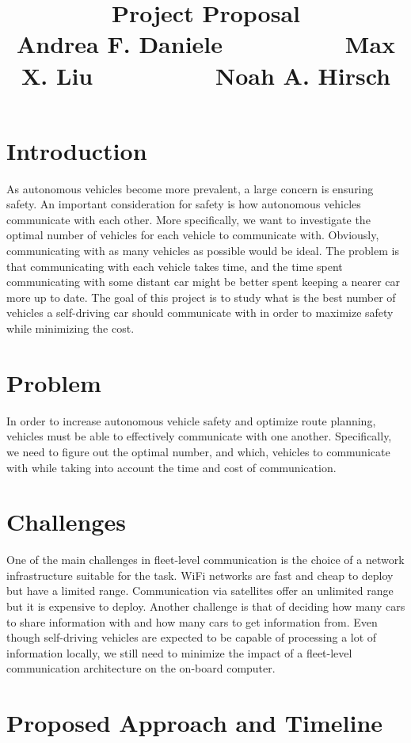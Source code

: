 \documentclass{article}
\title{Project Proposal\vspace{-6pt}\\{\large Andrea F. Daniele $\hspace{2cm}$ Max X. Liu $\hspace{2cm}$ Noah A. Hirsch }}
\begin{document}
\maketitle


\vspace{-1.2cm}

\section*{Introduction}
\vspace{-.3cm}
As autonomous vehicles become more prevalent, a large concern is ensuring safety. 
An important consideration for safety is how autonomous vehicles communicate with each other. 
More specifically, we want to investigate the optimal number of vehicles for each vehicle to communicate with. 
Obviously, communicating with as many vehicles as possible would be ideal. 
The problem is that communicating with each vehicle takes time, and the time spent communicating 
with some distant car might be better spent keeping a nearer car more up to date. 
The goal of this project is to study what is the best number of vehicles a self-driving car should 
communicate with in order to maximize safety while minimizing the cost.

\section*{Problem}
\vspace{-.3cm}
In order to increase autonomous vehicle safety and optimize route planning, vehicles must be able to effectively communicate with one another. Specifically, we need to figure out the optimal number, and which, vehicles to communicate with while taking into account the time and cost of communication.

\section*{Challenges}
\vspace{-.3cm}
One of the main challenges in fleet-level communication is the choice of a network infrastructure suitable
for the task. WiFi networks are fast and cheap to deploy but have a limited range. Communication via satellites
offer an unlimited range but it is expensive to deploy. Another challenge is that of deciding how many cars
to share information with and how many cars to get information from. Even though self-driving vehicles are
expected to be capable of processing a lot of information locally, we still need to minimize the impact of a 
fleet-level communication architecture on the on-board computer.

\section*{Proposed Approach and Timeline}
\vspace{-.3cm}




%
%
\end{document}
